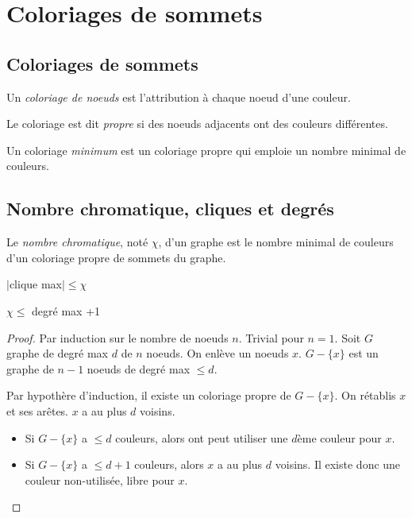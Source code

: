 \section{Coloriages de sommets}
\subsection{Coloriages de sommets}
\begin{mydef}
  Un \emph{coloriage de noeuds} est l’attribution à chaque noeud d’une couleur.

  Le coloriage est dit \emph{propre} si des noeuds adjacents ont des couleurs différentes.

  Un coloriage \emph{minimum} est un coloriage propre qui emploie un nombre minimal de couleurs.
\end{mydef}

\subsection{Nombre chromatique, cliques et degrés}
\begin{mydef}
  Le \emph{nombre chromatique}, noté $\chi$, d’un graphe est le nombre minimal de couleurs d’un coloriage propre de sommets du graphe.
\end{mydef}

\begin{mytheo}
  $|$clique max$| \leq \chi$
\end{mytheo}

\begin{mytheo}
  $\chi \leq $ degré max +1
  \begin{proof}
    Par induction sur le nombre de noeuds $n$.
    Trivial pour $n = 1$.
    Soit $G$ graphe de degré max $d$ de $n$ noeuds. On enlève un noeuds $x$. $G-\{x\}$ est un graphe de $n-1$ noeuds de degré max $\leq d$.

    Par hypothère d'induction, il existe un coloriage propre de $G-\{x\}$.
    On rétablis $x$ et ses arêtes. $x$ a au plus $d $ voisins.

    \begin{itemize}
    \item Si  $G-\{x\}$ a $\leq d$ couleurs, alors ont peut utiliser une $d$ème couleur pour $x$.
    \item  Si $G-\{x\}$ a $\leq d+1$ couleurs, alors $x$ a au plus $d$ voisins. Il existe donc une couleur non-utilisée, libre pour $x$.
    \end{itemize}
  \end{proof}
\end{mytheo}
